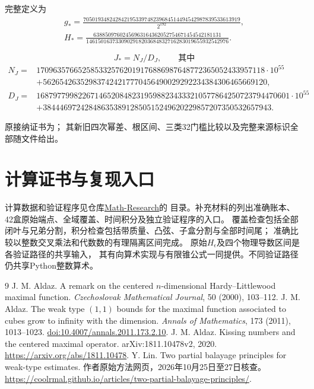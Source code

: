 \documentclass[UTF8,fontset=fandol,zihao=-4,a4paper]{ctexart}
\newcommand{\1}{\mathbf 1}
\begin{document}
完整定义为
\[
 \begin{gathered}
 g_*=\frac{705019348242842195339748239684514494542987839533613919}{2^{192}},
 \\
 H_*=\frac{63885097602456963164362052754671454542181131}
 {1461501637330902918203684832716283019655932542976}.
 \end{gathered}
\]
\noindent\begin{minipage}{\textwidth}
\[
 J_*=N_J/D_J,\qquad\text{其中}
\]
{\small
\[
\begin{aligned}
 N_J={}&1709635766525853325762019176886987648772365052433957118\cdot10^{55}\\
       &+562654263529837424217770456490029292234384306465669120,\\
 D_J={}&1687977998226714652084823195988234333210577864250723794470601\cdot10^{55}\\
       &+3844469724284863538912850515249620229857207350532657943.
\end{aligned}
\]
}

\end{minipage}

原接纳证书为；
其新旧四次幂差、根区间、三类32门槛比较以及完整来源标识全部随文件给出。

\section{计算证书与复现入口}
计算数据和验证程序见仓库\href{https://github.com/alizeisnotalice/Math-Research}{Math-Research}的
目录。补充材料的列出准确账本、
42盒原始端点、全域覆盖、时间积分及独立验证程序的入口。
覆盖检查包括全部闭叶与兄弟分割，积分检查包括带质量、凸弦、子盒分割与全部时间尾；
准确比较以整数交叉乘法和代数数的有理隔离区间完成。
原始$H_\epsilon$及四个物理导数区间是各验证路径的共享输入，
其有向算术实现与有限锥公式一同提供。不同验证路径仍共享Python整数算术。

\begin{thebibliography}{9}
\footnotesize\setlength{\itemsep}{2pt}\setlength{\parskip}{0pt}
J. M. Aldaz. A remark on the centered $n$-dimensional Hardy--Littlewood maximal function.
\emph{Czechoslovak Mathematical Journal}, 50 (2000), 103--112.
J. M. Aldaz. The weak type $(1,1)$ bounds for the maximal function associated to cubes
grow to infinity with the dimension.
\emph{Annals of Mathematics}, 173 (2011), 1013--1023.
\href{https://doi.org/10.4007/annals.2011.173.2.10}{doi:10.4007/annals.2011.173.2.10}.
J. M. Aldaz. Kissing numbers and the centered maximal operator.
arXiv:1811.10478v2, 2020.
\url{https://arxiv.org/abs/1811.10478}.
Y. Lin. Two partial balayage principles for weak-type estimates.
作者原始方法网页，2026年10月25日至27日核查。
\url{https://coolrmal.github.io/articles/two-partial-balayage-principles/}.
\end{thebibliography}
\end{document}
